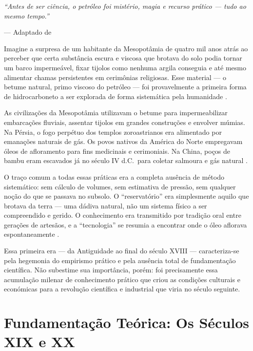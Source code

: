 \documentclass[
  12pt,
  a4paper,
  oneside,
  brazilian,
  sumario=tradicional
]{abntex2}
\begin{document}
\epigraph{\textit{``Antes de ser ciência, o petróleo foi mistério,
magia e recurso prático — tudo ao mesmo tempo.''}}{--- Adaptado de
}

Imagine a surpresa de um habitante da Mesopotâmia de quatro mil anos
atrás ao perceber que certa substância escura e viscosa que brotava do
solo podia tornar um barco impermeável, fixar tijolos como nenhuma
argila conseguia e até mesmo alimentar chamas persistentes em
cerimônias religiosas. Esse material — o betume natural, primo viscoso
do petróleo — foi provavelmente a primeira forma de hidrocarboneto a
ser explorada de forma sistemática pela humanidade
\cite{yergin1991}.

As civilizações da Mesopotâmia utilizavam o betume para impermeabilizar
embarcações fluviais, assentar tijolos em grandes construções e envolver
múmias. Na Pérsia, o fogo perpétuo dos templos zoroastrianos era
alimentado por emanações naturais de gás. Os povos nativos da América
do Norte empregavam óleos de afloramento para fins medicinais e
cerimoniais. Na China, poços de bambu eram escavados já no século
IV d.C.\ para coletar salmoura e gás natural \cite{yergin1991}.

O traço comum a todas essas práticas era a completa ausência de método
sistemático: sem cálculo de volumes, sem estimativa de pressão, sem
qualquer noção do que se passava no subsolo. O ``reservatório'' era
simplesmente aquilo que brotava da terra — uma dádiva natural, não um
sistema físico a ser compreendido e gerido. O conhecimento era
transmitido por tradição oral entre gerações de artesãos, e a
``tecnologia'' se resumia a encontrar onde o óleo aflorava
espontaneamente \cite{rosa2006, ramos2016}.

Essa primeira era — da Antiguidade ao final do século XVIII —
caracteriza-se pela hegemonia do empirismo prático e pela ausência
total de fundamentação científica. Não subestime sua importância,
porém: foi precisamente essa acumulação milenar de conhecimento prático
que criou as condições culturais e económicas para a revolução
científica e industrial que viria no século seguinte.

\section{Fundamentação Teórica: Os Séculos XIX e XX}
\label{sec:fundamentacao}
\end{document}
